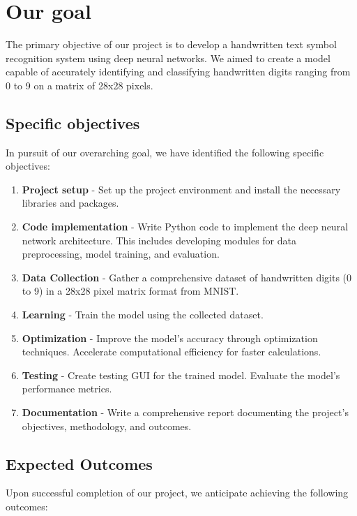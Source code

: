 \documentclass{article}
\begin{document}
\newpage
\section{Our goal}

The primary objective of our project is to develop a handwritten text symbol recognition system using deep neural networks. We aimed to create a model capable of accurately identifying and classifying handwritten digits ranging from 0 to 9 on a matrix of 28x28 pixels.

\subsection{Specific objectives}

In pursuit of our overarching goal, we have identified the following specific objectives:

\begin{enumerate}
    \item \textbf{Project setup} - Set up the project environment and install the necessary libraries and packages.
    \item \textbf{Code implementation} - Write Python code to implement the deep neural network architecture. This includes developing modules for data preprocessing, model training, and evaluation.
    \item \textbf{Data Collection} - Gather a comprehensive dataset of handwritten digits (0 to 9) in a 28x28 pixel matrix format from MNIST.
	\item \textbf{Learning} - Train the model using the collected dataset.
	\item \textbf{Optimization} - Improve the model's accuracy through optimization techniques. Accelerate computational efficiency for faster calculations.
    \item \textbf{Testing} - Create testing GUI for the trained model. Evaluate the model's performance metrics.
	\item \textbf{Documentation} - Write a comprehensive report documenting the project's objectives, methodology, and outcomes.
\end{enumerate}

\subsection{Expected Outcomes}

Upon successful completion of our project, we anticipate achieving the following outcomes:
\end{document}
